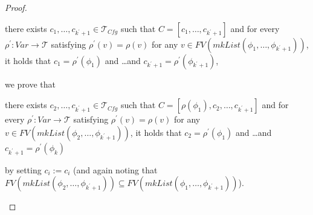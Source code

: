 \documentclass{article}
\newcommand{\Tcfg}{\mathcal{T}_{\mathit{Cfg}}}
\newenvironment{proofenv}
  {
    \VerbatimEnvironment\begin{tcolorbox}[colback=black!0!white] %
  }
  {
   \end{tcolorbox}
  }
\begin{document}
\begin{proof}
\begin{itemize}
\begin{itemize}
        \begin{proofenv}
        there exists $c_1, \ldots, c_{k^\prime + 1} \in \Tcfg$ such that $C = [c_1, \ldots, c_{k^\prime + 1}]$
        and for every $\rho^\prime : \mathit{Var} \to \mathcal{T}$ satisfying
        $\rho^\prime(v) = \rho(v)$ for any
        $v \in \mathit{FV}(\mathit{mkList}(\phi_1, \ldots, \phi_{k^\prime + 1}))$,
        it holds that
        $c_1 = \rho^\prime(\phi_1)$ and \ldots and $c_{k^\prime + 1} = \rho^\prime(\phi_{k^\prime + 1})$,
        \end{proofenv}
        we prove that
        \begin{proofenv}
        there exists $c_2, \ldots, c_{k^\prime + 1} \in \Tcfg$ such that
        $C = [\rho(\phi_1), c_2, \ldots, c_{k^\prime+1}]$
        and for every $\rho^\prime : \mathit{Var} \to \mathcal{T}$ satisfying
        $\rho^\prime(v) = \rho(v)$ for any
        $v \in \mathit{FV}(\mathit{mkList}(\phi_2, \ldots, \phi_{k^\prime+1}))$,
        it holds that
        $c_2 = \rho^\prime(\phi_1)$ and \ldots and $c_{k^\prime+1} = \rho^\prime(\phi_k)$
        \end{proofenv}
        by setting $c_i := c_i$
        (and again noting that $\mathit{FV}(\mathit{mkList}(\phi_2,\ldots,\phi_{k^\prime+1})) \subseteq \mathit{FV}(\mathit{mkList}(\phi_1,\ldots,\phi_{k^\prime+1}))$).
    \end{itemize}
\end{itemize}
\end{proof}
\end{document}
